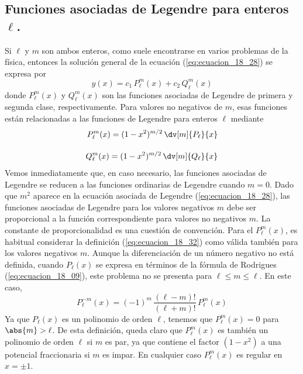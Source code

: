\subsection*{Funciones asociadas de Legendre para enteros $\ell$.}
Si $\ell$ y $m$ son ambos enteros, como suele encontrarse en varios problemas de la física, entonces la solución general de la ecuación (\ref{eq:ecuacion_18_28}) se expresa por
\begin{equation}
y(x) = c_{1} \, P_{\ell}^{m} (x) + c_{2} \, Q_{\ell}^{m} (x)
\label{eq:ecuacion_18_31}
\end{equation}
donde $P_{\ell}^{m} (x)$ y $Q_{\ell}^{m} (x)$ son las funciones asociadas de Legendre de primera y segunda clase, respectivamente. Para valores no negativos de $m$, esas funciones están relacionadas a las funciones de Legendre para enteros $\ell$ mediante
\begin{align}
\begin{aligned}
P_{\ell}^{m} (x) = (1 - x^{2})^{m/2} \, \dv[m]{P_{\ell}}{x} \\[1em]
Q_{\ell}^{m} (x) = (1 - x^{2})^{m/2} \, \dv[m]{Q_{\ell}}{x}
\end{aligned}
\label{eq:ecuacion_18_32}
\end{align}
Vemos inmediatamente que, en caso necesario, las funciones asociadas de Legendre se reducen a las funciones ordinarias de Legendre cuando $m = 0$. Dado que $m^{2}$ aparece en la ecuación asociada de Legendre (\ref{eq:ecuacion_18_28}), las funciones asociadas de Legendre para los valores negativos $m$ debe ser proporcional a la función correspondiente para valores no negativos $m$. La constante de proporcionalidad es una cuestión de convención. Para el $P_{\ell}^{m} (x) $, es habitual considerar la definición (\ref{eq:ecuacion_18_32}) como válida también para los valores negativos $m$. Aunque la diferenciación de un número negativo no está definida, cuando $P_{\ell}(x)$ se expresa en términos de la fórmula de Rodrigues (\ref{eq:ecuacion_18_09}), este problema no se presenta para $\ell \leq m \leq \ell$. En este caso,
\begin{equation}
P_{\ell}^{-m} (x) = (-1)^{m} \, \dfrac{(\ell - m)!}{(\ell + m)!} \, P_{\ell}^{m} (x)
\label{eq:ecuacion_18_33}
\end{equation}
Ya que $P_{\ell}(x)$ es un polinomio de orden $\ell$, tenemos que $P_{\ell}^{m}(x) = 0$ para $\abs{m} > \ell$. De esta definición, queda claro que $P_{\ell}^{m} (x)$ es también un polinomio de orden $\ell$ si $m$ es par, ya que contiene el factor $(1-x^{2})$ a una potencial fraccionaria si $m$ es impar. En cualquier caso $P_{\ell}^{m}(x)$ es regular en $x = \pm 1$.
